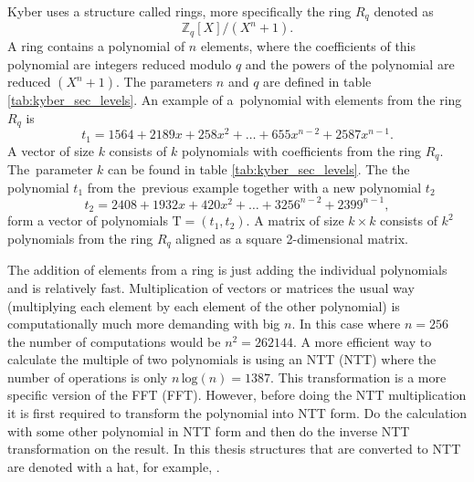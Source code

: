 Kyber uses a structure called rings, more specifically the ring $R_q$ denoted as
\begin{equation}
  \mathbb{Z}_q[X]/(X^n+1).
\end{equation}
A ring contains a polynomial of $n$ elements, where the coefficients of this polynomial are integers reduced modulo $q$ and the powers of the polynomial are reduced $(X^n+1)$. The parameters $n$ and $q$ are defined in table \ref{tab:kyber_sec_levels}. An example of a~polynomial with elements from the ring $R_q$ is
\begin{equation}
  t_1 = 1564 + 2189x + 258x^2 + \dots + 655x^{n-2} + 2587x^{n-1}.
\end{equation}
A vector of size $k$ consists of $k$ polynomials with coefficients from the ring $R_q$. The~parameter $k$ can be found in table \ref{tab:kyber_sec_levels}. The the polynomial $t_1$ from the~previous example together with a new polynomial $t_2$
\begin{equation}
  t_2 = 2408 + 1932x + 420x^2 + \dots + 3256^{n-2} + 2399^{n-1},
\end{equation}
form a vector of polynomials $\mathrm{T}=(t_1, t_2)$. A matrix of size $k\times k$ consists of $k^2$ polynomials from the ring $R_q$ aligned as a square 2-dimensional matrix. \cite{YbbuGxVPF0GGTxfN}

The addition of elements from a ring is just adding the individual polynomials and is relatively fast. Multiplication of vectors or matrices the usual way (multiplying each element by each element of the other polynomial) is computationally much more demanding with big $n$. In this case where $n=256$ the number of computations would be $n^2=262144$. A more efficient way to calculate the multiple of two polynomials is using an NTT (\acl{NTT}) where the number of operations is only $n\,\mathrm{log}(n)=1387$. This transformation is a more specific version of the FFT (\acl{FFT}). However, before doing the NTT multiplication it is first required to transform the polynomial into NTT form. Do the calculation with some other polynomial in NTT form and then do the inverse NTT transformation on the result. In this thesis structures that are converted to NTT are denoted with a hat, for example, . \cite{Liang2021}
